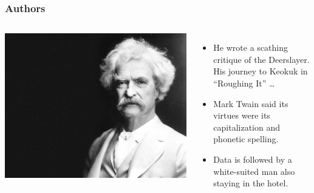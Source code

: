 \documentclass[compress]{beamer}
\begin{document}
\begin{frame}
\frametitle{Authors}

\begin{columns}
  \includegraphics[width=.8\linewidth]{qb/instruction_figures/Mark_Twain}

  \begin{itemize}

    \item \alert<2>{He} wrote a scathing critique of the Deerslayer.  \alert<2>{His} journey to
  Keokuk in ``Roughing It'' \dots

    \item \alert<2>{Mark Twain} said its virtues were its capitalization and phonetic spelling.

     \item Data is followed by \alert<2>{a white-suited man also
         staying in the hotel}.
       \end{itemize}

\end{columns}

\end{frame}
\end{document}
